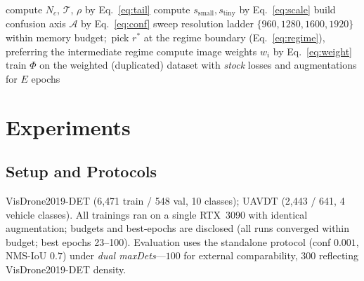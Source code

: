 \documentclass[journal]{IEEEtran}
\newcommand{\visdrone}{VisDrone2019-DET}
\newcommand{\uavdt}{UAVDT}
\begin{document}
\begin{algorithm}[!t]
\caption{DAHP: Profile, Map, Train (Non-Invasively)}
\label{alg:dahp}
\BlankLine
{}
compute $N_c$, $\mathcal{T}$, $\rho$ by Eq.~\eqref{eq:tail}\;
compute $s_{\mathrm{small}}, s_{\mathrm{tiny}}$ by Eq.~\eqref{eq:scale}\;
build confusion axis $\mathcal{A}$ by Eq.~\eqref{eq:conf}\;
sweep resolution ladder $\{960,1280,1600,1920\}$ within memory budget;\ pick $r^\ast$ at the regime boundary (Eq.~\eqref{eq:regime}), preferring the intermediate regime\;
compute image weights $w_i$ by Eq.~\eqref{eq:weight}\;
train $\Phi$ on the weighted (duplicated) dataset with \emph{stock} losses and augmentations for $E$ epochs\;
\Return{$\{\Phi^\ast\}$}\;
\end{algorithm}

\section{Experiments}
\label{sec:experiments}
\subsection{Setup and Protocols}
\visdrone{} \cite{visdrone} (6{,}471 train / 548 val, 10 classes); \uavdt{} \cite{uavdt} (2{,}443 / 641, 4 vehicle classes). All trainings ran on a single RTX~3090 with identical augmentation; budgets and best-epochs are disclosed (all runs converged within budget; best epochs 23--100). Evaluation uses the standalone protocol (conf $0.001$, NMS-IoU $0.7$) under \emph{dual maxDets}---$100$ for external comparability, $300$ reflecting \visdrone{} density.
\end{document}
